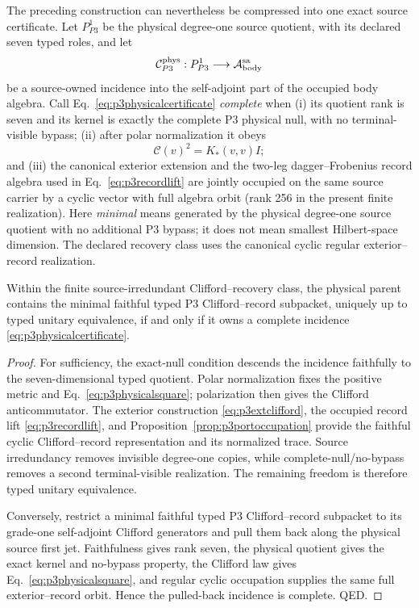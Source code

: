 The preceding construction can nevertheless be compressed into one exact
source certificate.  Let $P_{P3}^1$ be the physical degree-one source
quotient, with its declared seven typed roles, and let
\begin{equation}
 \mathcal C_{P3}^{\rm phys}:P_{P3}^1\longrightarrow
 \mathcal A_{\rm body}^{\rm sa}
 \label{eq:p3physicalcertificate}
\end{equation}
be a source-owned incidence into the self-adjoint part of the occupied body
algebra.  Call Eq.~\eqref{eq:p3physicalcertificate} \emph{complete} when
(i) its quotient rank is seven and its kernel is exactly the complete P3
physical null, with no terminal-visible bypass; (ii) after polar
normalization it obeys
\begin{equation}
 \mathcal C(v)^2=K_*(v,v)I;
 \label{eq:p3physicalsquare}
\end{equation}
and (iii) the canonical exterior extension and the two-leg
dagger--Frobenius record algebra used in Eq.~\eqref{eq:p3recordlift} are
jointly occupied on the same source carrier by a cyclic vector with full
algebra orbit (rank 256 in the present finite realization).
Here \emph{minimal} means generated by the physical degree-one source
quotient with no additional P3 bypass; it does not mean smallest Hilbert-space
dimension.  The declared recovery class uses the canonical cyclic regular
exterior--record realization.

\begin{theorem}
\label{thm:p3physicalcertificate}
Within the finite source-irredundant Clifford--recovery class, the physical
parent contains the minimal faithful typed P3 Clifford--record subpacket,
uniquely up to typed unitary equivalence, if and only if it owns a complete
incidence \eqref{eq:p3physicalcertificate}.
\end{theorem}

\begin{proof}
For sufficiency, the exact-null condition descends the incidence faithfully
to the seven-dimensional typed quotient.  Polar normalization fixes the
positive metric and Eq.~\eqref{eq:p3physicalsquare}; polarization then gives
the Clifford anticommutator.  The exterior construction
\eqref{eq:p3extclifford}, the occupied record lift
\eqref{eq:p3recordlift}, and Proposition~\ref{prop:p3portoccupation} provide
the faithful cyclic Clifford--record representation and its normalized
trace.  Source irredundancy removes invisible degree-one copies, while
complete-null/no-bypass removes a second terminal-visible realization.
The remaining freedom is therefore typed unitary equivalence.

Conversely, restrict a minimal faithful typed P3 Clifford--record subpacket
to its grade-one self-adjoint Clifford generators and pull them back along
the physical source first jet.  Faithfulness gives rank seven, the physical
quotient gives the exact kernel and no-bypass property, the Clifford law
gives Eq.~\eqref{eq:p3physicalsquare}, and regular cyclic occupation supplies
the same full exterior--record orbit.  Hence the pulled-back incidence is
complete. QED.
\end{proof}
